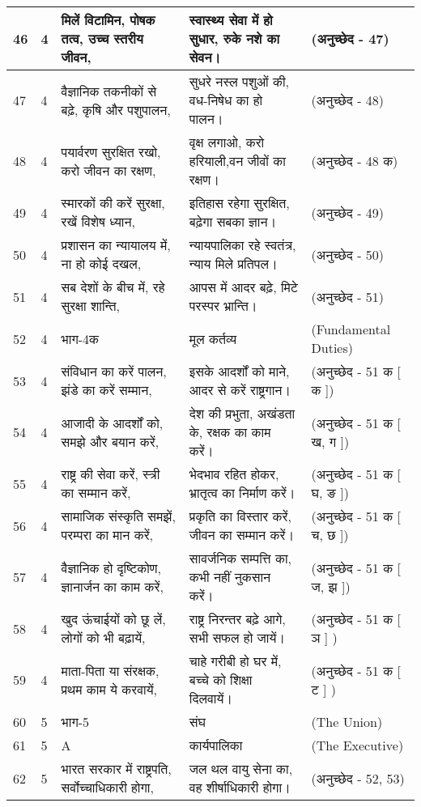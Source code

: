 \begin{longtable}{|l|l|l|l|l|}
46 & 4 & मिलें विटामिन, पोषक तत्व, उच्च स्तरीय जीवन, & स्वास्थ्य सेवा में हो सुधार, रुके नशे का सेवन। & (अनुच्छेद - 47) \\ \hline 
47 & 4 & वैज्ञानिक तकनीकों से बढ़े, कृषि और पशुपालन, & सुधरे नस्ल पशुओं की, वध-निषेध का हो पालन। & (अनुच्छेद - 48) \\ \hline 
48 & 4 & पयार्वरण सुरक्षित रखो, करो जीवन का रक्षण, & वृक्ष लगाओ, करो हरियाली,वन जीवों का रक्षण। & (अनुच्छेद - 48 क) \\ \hline 
49 & 4 & स्मारकों की करें सुरक्षा, रखें विशेष ध्यान, & इतिहास रहेगा सुरक्षित, बढ़ेगा सबका ज्ञान। & (अनुच्छेद - 49) \\ \hline 
50 & 4 & प्रशासन का न्यायालय में, ना हो कोई दखल, & न्यायपालिका रहे स्वतंत्र, न्याय मिले प्रतिपल। & (अनुच्छेद - 50) \\ \hline 
51 & 4 & सब देशों के बीच में, रहे सुरक्षा शान्ति, & आपस में आदर बढ़े, मिटे परस्पर भ्रान्ति। & (अनुच्छेद - 51) \\ \hline 
52 & 4 & भाग-4क & मूल कर्तव्य & (Fundamental Duties) \\ \hline 
53 & 4 & संविधान का करें पालन, झंडे का करें सम्मान, & इसके आदर्शों को माने, आदर से करें राष्ट्रगान। & (अनुच्छेद - 51 क [ क ]) \\ \hline 
54 & 4 & आजादी के आदर्शों को, समझे और बयान करें, & देश की प्रभुता, अखंडता के, रक्षक का काम करें। & (अनुच्छेद - 51 क [ ख, ग ]) \\ \hline 
55 & 4 & राष्ट्र की सेवा करें, स्त्री का सम्मान करें, & भेदभाव रहित होकर, भ्रातृत्व का निर्माण करें। & (अनुच्छेद - 51 क [ घ, ङ ]) \\ \hline 
56 & 4 & सामाजिक संस्कृति समझें, परम्परा का मान करें, & प्रकृति का विस्तार करें, जीवन का सम्मान करें। & (अनुच्छेद - 51 क [ च, छ ]) \\ \hline 
57 & 4 & वैज्ञानिक हो दृष्टिकोण, ज्ञानार्जन का काम करें, & सावर्जनिक सम्पत्ति का, कभी नहीं नुकसान करें। & (अनुच्छेद - 51 क [ ज, झ ]) \\ \hline 
58 & 4 & खुद ऊंचाईयों को छू लें, लोगों को भी बढ़ायें, & राष्ट्र निरन्तर बढ़े आगे, सभी सफल हो जायें। & (अनुच्छेद - 51 क [ ञ ] ) \\ \hline 
59 & 4 & माता-पिता या संरक्षक, प्रथम काम ये करवायें, & चाहे गरीबी हो घर में, बच्चे को शिक्षा दिलवायें। & (अनुच्छेद - 51 क [ ट ] ) \\ \hline 
60 & 5 & भाग-5 & संघ  & (The Union) \\ \hline 
61 & 5 & A & कार्यपालिका  & (The Executive) \\ \hline 
62 & 5 & भारत सरकार में राष्ट्रपति, सर्वोच्चाधिकारी होगा, & जल थल वायु सेना का, वह शीर्षाधिकारी होगा। & (अनुच्छेद - 52, 53) \\ \hline 

\end{longtable}
